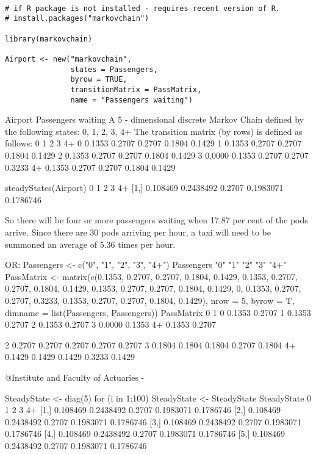 \documentclass[a4paper,12pt]{article}
\begin{document}
\begin{framed}
\begin{verbatim}

# if R package is not installed - requires recent version of R.
# install.packages("markovchain") 

library(markovchain)

Airport <- new("markovchain", 
               states = Passengers, 
               byrow = TRUE, 
               transitionMatrix = PassMatrix, 
               name = "Passengers waiting")    
\end{verbatim}
\end{framed}





Airport
Passengers waiting
A 5 - dimensional discrete Markov Chain defined by the
following states:
0, 1, 2, 3, 4+
The transition matrix (by rows) is defined as follows:
0
1
2
3
4+
0 0.1353 0.2707 0.2707 0.1804 0.1429
1 0.1353 0.2707 0.2707 0.1804 0.1429
2 0.1353 0.2707 0.2707 0.1804 0.1429
3 0.0000 0.1353 0.2707 0.2707 0.3233
4+ 0.1353 0.2707 0.2707 0.1804 0.1429

steadyStates(Airport)
0
1
2
3
4+
[1,] 0.108469 0.2438492 0.2707 0.1983071 0.1786746


So there will be four or more passengers waiting when 17.87 per cent of the pods arrive.
Since there are 30 pods arriving per hour, a taxi will need to be summoned an average of 5.36 times per hour.




OR:
Passengers <- c("0", "1", "2", "3", "4+")
Passengers
 "0" "1"
"2"
"3"
"4+"
PassMatrix <- matrix(c(0.1353, 0.2707, 0.2707, 0.1804,
0.1429, 0.1353, 0.2707, 0.2707, 0.1804, 0.1429, 0.1353,
0.2707, 0.2707, 0.1804, 0.1429, 0, 0.1353, 0.2707,
0.2707, 0.3233, 0.1353, 0.2707, 0.2707, 0.1804, 0.1429),
nrow = 5, byrow = T, dimname = list(Passengers,
Passengers))
PassMatrix
0
1
0 0.1353 0.2707
1 0.1353 0.2707
2 0.1353 0.2707
3 0.0000 0.1353
4+ 0.1353 0.2707

2
0.2707
0.2707
0.2707
0.2707
0.2707
3
0.1804
0.1804
0.1804
0.2707
0.1804
4+
0.1429
0.1429
0.1429
0.3233
0.1429



@Institute and Faculty of Actuaries - 

SteadyState <- diag(5)
for (i in 1:100){
SteadyState <- SteadyState %
}
SteadyState
0
1
2
3
4+
[1,] 0.108469 0.2438492 0.2707 0.1983071 0.1786746
[2,] 0.108469 0.2438492 0.2707 0.1983071 0.1786746
[3,] 0.108469 0.2438492 0.2707 0.1983071 0.1786746
[4,] 0.108469 0.2438492 0.2707 0.1983071 0.1786746
[5,] 0.108469 0.2438492 0.2707 0.1983071 0.1786746
\end{document}
